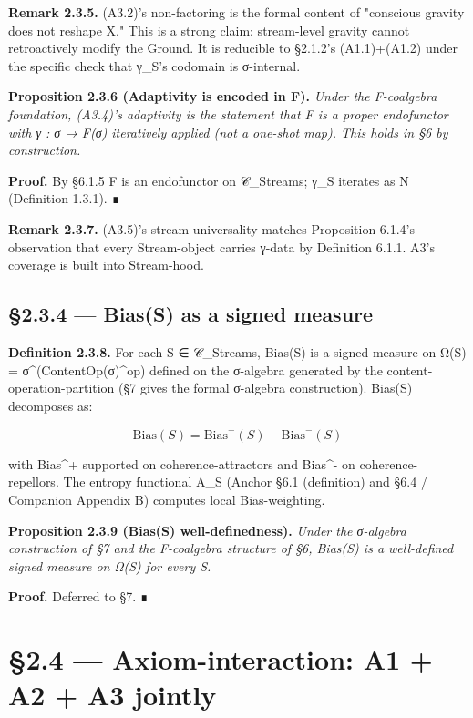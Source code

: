 \documentclass[11pt, openany]{book}
\newcommand{\sectionbreak}{\clearpage}
\begin{document}
\textbf{Remark 2.3.5.} (A3.2)'s non-factoring is the formal content of "conscious gravity does not reshape X." This is a strong claim: stream-level gravity cannot retroactively modify the Ground. It is reducible to §2.1.2's (A1.1)+(A1.2) under the specific check that γ\_\allowbreak{}S's codomain is σ-internal.

\textbf{Proposition 2.3.6 (Adaptivity is encoded in F).} \textit{Under the F-coalgebra foundation, (A3.4)'s adaptivity is the statement that F is a proper endofunctor with γ : σ → F(σ) iteratively applied (not a one-shot map). This holds in §6 by construction.}

\textbf{Proof.} By §6.1.5 F is an endofunctor on 𝒞\_\allowbreak{}Streams; γ\_\allowbreak{}S iterates as N (Definition 1.3.1). ∎

\textbf{Remark 2.3.7.} (A3.5)'s stream-universality matches Proposition 6.1.4's observation that every Stream-object carries γ-data by Definition 6.1.1. A3's coverage is built into Stream-hood.

\subsection{§2.3.4 --- Bias(S) as a signed measure}

\textbf{Definition 2.3.8.} For each S ∈ 𝒞\_\allowbreak{}Streams, Bias(S) is a signed measure on Ω(S) = σ\textasciicircum{}(ContentOp(σ)\textasciicircum{}op) defined on the σ-algebra generated by the content-operation-partition (§7 gives the formal σ-algebra construction). Bias(S) decomposes as:

\[
\mathrm{Bias}(S) = \mathrm{Bias}^+(S) - \mathrm{Bias}^-(S)
\]

with Bias\textasciicircum{}+ supported on coherence-attractors and Bias\textasciicircum{}- on coherence-repellors. The entropy functional A\_\allowbreak{}S (Anchor §6.1 (definition) and §6.4 / Companion Appendix B) computes local Bias-weighting.

\textbf{Proposition 2.3.9 (Bias(S) well-definedness).} \textit{Under the σ-algebra construction of §7 and the F-coalgebra structure of §6, Bias(S) is a well-defined signed measure on Ω(S) for every S.}

\textbf{Proof.} Deferred to §7. ∎

\sectionbreak

\section{§2.4 --- Axiom-interaction: A1 + A2 + A3 jointly}
\end{document}
